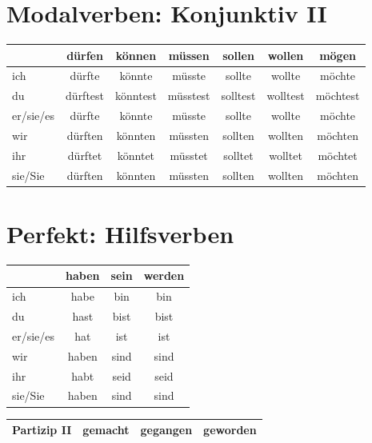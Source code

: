 \section{Modalverben: Konjunktiv II}
\label{sec:ModalverbenKonjunktivII}

\begin{center}
\begin{tabular}{|l|c|c|c|c|c|c|}
\hline
\textbf{} & \textbf{dürfen} & \textbf{können} & \textbf{müssen} & \textbf{sollen} & \textbf{wollen} & \textbf{mögen} \\ \hline
ich & dürfte & könnte & müsste & sollte & wollte & möchte \\ \hline
du & dürftest & könntest & müsstest & solltest & wolltest & möchtest \\ \hline
er/sie/es & dürfte & könnte & müsste & sollte & wollte & möchte \\ \hline
wir & dürften & könnten & müssten & sollten & wollten & möchten \\ \hline
ihr & dürftet & könntet & müsstet & solltet & wolltet & möchtet \\ \hline
sie/Sie & dürften & könnten & müssten & sollten & wollten & möchten \\ \hline
\end{tabular}
\end{center}

\section{Perfekt: Hilfsverben}
\label{sec:PerfektHilfsverben}

\begin{center}
\begin{tabular}{|l|c|c|c|}
\hline
\textbf{} & \textbf{haben} & \textbf{sein} & \textbf{werden} \\ \hline
ich & habe & bin & bin \\ \hline
du & hast & bist & bist \\ \hline
er/sie/es & hat & ist & ist \\ \hline
wir & haben & sind & sind \\ \hline
ihr & habt & seid & seid \\ \hline
sie/Sie & haben & sind & sind \\ \hline
\end{tabular}
\end{center}

\begin{center}
\begin{tabular}{|l|c|c|c|}
\hline
\textbf{Partizip II} & \textbf{gemacht} & \textbf{gegangen} & \textbf{geworden} \\ \hline
\end{tabular}
\end{center}

